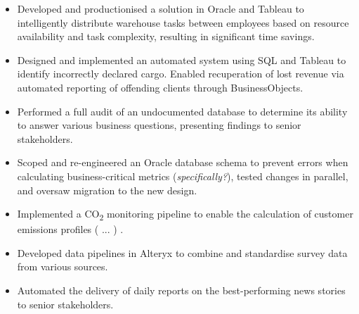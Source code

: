 \begin{paracol}{2}
\begin{itemize}
\medskip
{}

\end{itemize}

\divider

\begin{itemize}
\item Developed and productionised a solution in Oracle and Tableau to intelligently distribute warehouse tasks between employees based on resource availability and task complexity, resulting in significant time savings.
\item Designed and implemented an automated system using SQL and Tableau to identify incorrectly declared cargo. Enabled recuperation of lost revenue via automated reporting of offending clients through BusinessObjects.
\item Performed a full audit of an undocumented database to determine its ability to answer various business questions, presenting findings to senior stakeholders.
\item Scoped and re-engineered an Oracle database schema to prevent errors when calculating business-critical metrics (\textit{specifically?}), tested changes in parallel, and oversaw migration to the new design.
\item Implemented a CO\textsubscript{2} monitoring pipeline to enable the calculation of customer emissions profiles ( ... ) .

\medskip
{}

\end{itemize}

\divider

\begin{itemize}
\item Developed data pipelines in Alteryx to combine and standardise survey data from various sources.
\item Automated the delivery of daily reports on the best-performing news stories to senior stakeholders.


\end{itemize}
\end{paracol}
